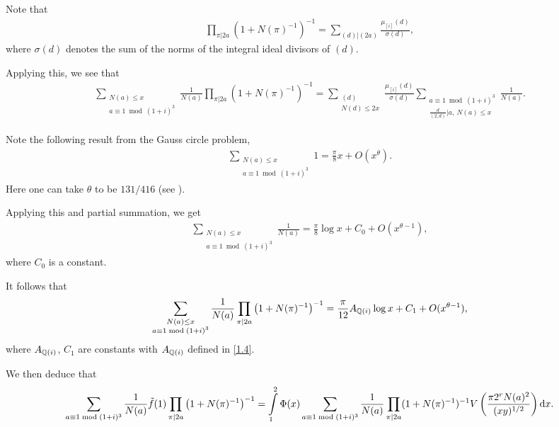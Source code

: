 \documentclass[twoside,leqno,10pt, A4]{amsart}
\begin{document}
   Note that
\begin{align*}
  \prod_{\pi | 2a}(1+N(\pi)^{-1})^{-1}=\sum_{(d) | (2a)}\frac {\mu_{[i]}(d)}{\sigma(d)},
\end{align*}
   where $\sigma(d)$ denotes the sum of the norms of the integral ideal divisors of $(d)$. \newline

   Applying this, we see that
\begin{align*}
  \sum_{\substack{N(a) \leq x \\ a \equiv 1 \bmod {(1+i)^3}}} \frac{1}{N(a)}\prod_{\pi |
  2a} \left( 1+N(\pi)^{-1} \right)^{-1}=\sum_{\substack{ (d) \\ N(d) \leq 2x}}\frac {\mu_{[i]}(d)}{\sigma(d)}\sum_{\substack{a \equiv 1 \bmod {(1+i)^3} \\ \frac {d}{(2,d)}|a,\  N(a) \leq x}} \frac{1}{N(a)}.
\end{align*}

    Note the following result from the Gauss circle problem,
\begin{align*}
  \sum_{\substack{N(a) \leq x \\ a \equiv 1 \bmod {(1+i)^3}}} 1 =\frac {\pi}{8}x+O(x^{\theta}).
\end{align*}
    Here one can take $\theta$ to be $131/416$ (see \cite{Huxley1}). \newline

    Applying this and partial summation, we get
\begin{align*}
  \sum_{\substack{N(a) \leq x \\ a \equiv 1 \bmod {(1+i)^3}}} \frac{1}{N(a)} = \frac {\pi}{8}\log x+C_0+O(x^{\theta-1}),
\end{align*}
    where $C_0$ is a constant. \newline

    It follows that
\begin{align*}
  \sum_{\substack{N(a) \leq x \\ a \equiv 1 \bmod {(1+i)^3}}} \frac{1}{N(a)}\prod_{\pi |
  2a} \left( 1+N(\pi)^{-1} \right)^{-1}=\frac {\pi}{12}A_{\mathbb Q(i)} \log x+C_1+O(x^{\theta-1}),
\end{align*}
   where $A_{\mathbb Q(i)}$, $C_1$ are constants with $A_{\mathbb Q(i)}$ defined in \eqref{1.4}. \newline


   We then deduce that
\[ \sum_{a \equiv 1 \bmod {(1+i)^3}} \frac{1}{N(a)}\tilde{f}(1)\prod_{\pi |
  2a} \left( 1+N(\pi)^{-1} \right)^{-1} = \int\limits^{2}_{1}\Phi(x) \sum_{a \equiv 1 \bmod {(1+i)^3}} \frac{1}{N(a)}\prod_{\pi |
  2a}(1+N(\pi)^{-1})^{-1}V \left( \frac{\pi 2^rN(a)^2}{(xy)^{1/2}} \right) \mathrm{d} x. \]
\end{document}
